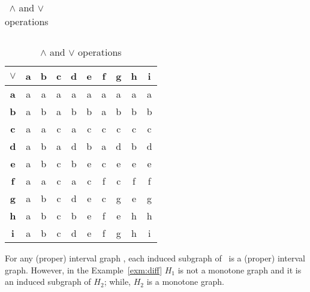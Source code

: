 \begin{example}
\begin{table}
\begin{minipage}{.45\linewidth}
\begin{tabular}{c|c c c c c c c c c}
\end{tabular}
\end{minipage}
\begin{minipage}{.45\linewidth}
\begin{tabular}{c|c c c c c c c c c}
\(\vee\) & \textbf{a} & \textbf{b} & \textbf{c} & \textbf{d} & \textbf{e} & \textbf{f} & \textbf{g} & \textbf{h} & \textbf{i} \\
\hline
\textbf{a} & a          & a          & a          & a          & a          & a          & a          & a          & a \\
\textbf{b} & a          & b          & a          & b          & b          & a          & b          & b          & b \\
\textbf{c} & a          & a          & c          & a          & c          & c          & c          & c          & c \\
\textbf{d} & a          & b          & a          & d          & b          & a          & d          & b          & d \\
\textbf{e} & a          & b          & c          & b          & e          & c          & e          & e          & e \\
\textbf{f} & a          & a          & c          & a          & c          & f          & c          & f          & f \\
\textbf{g} & a          & b          & c          & d          & e          & c          & g          & e          & g \\
\textbf{h} & a          & b          & c          & b          & e          & f          & e          & h          & h \\
\textbf{i} & a          & b          & c          & d          & e          & f          & g          & h          & i \\
\end{tabular}
\end{minipage}
\caption {\ensuremath{\wedge} and \ensuremath{\vee} operations} \label{tab:lattice}
\end{table}
\end{example}

For any (proper) interval graph \mH, each induced subgraph of \mH\ is a 
(proper) interval graph. However, in the Example~\ref{exm:diff} \(H_1\)
is not a monotone graph and it is an induced 
subgraph of \(H_2\); while, \(H_2\) is a monotone graph.

